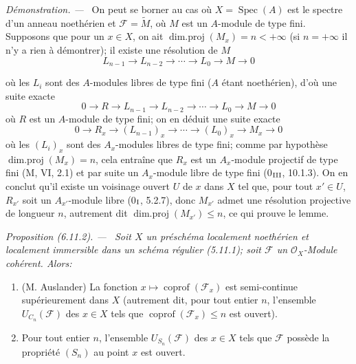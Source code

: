 \documentclass[10pt,oneside]{book}
\newcommand{\oldpage}[2][]{%
  \setcounter{footnote}{0}%
  \marginpar{\scriptsize\textbf{#1}~|~#2}\ignorespaces}
\newenvironment{proposition}[1][]{%
  \par\medskip\noindent\itshape Proposition (#1). ---\ }{\par}
\newenvironment{proof}{%
  \par\medskip\noindent\textit{Démonstration. ---\ }}{\par}
\begin{document}
\begin{proof}
On peut se borner au cas où $X=\operatorname{Spec}(A)$ est le spectre d'un
anneau noethérien et $\mathcal F=\widetilde M$, où $M$ est un $A$-module de
type fini. Supposons que pour un $x\in X$, on ait
$\operatorname{dim.proj}(M_x)=n<+\infty$ (si $n=+\infty$ il n'y a rien à
démontrer); il existe une résolution de $M$
\[
L_{n-1}\longrightarrow L_{n-2}\longrightarrow\cdots
\longrightarrow L_0\longrightarrow M\longrightarrow0
\]

\oldpage[IV-2]{159}

où les $L_i$ sont des $A$-modules libres de type fini ($A$ étant
noethérien), d'où une suite exacte
\[
0\longrightarrow R\longrightarrow L_{n-1}\longrightarrow L_{n-2}
\longrightarrow\cdots\longrightarrow L_0\longrightarrow M
\longrightarrow0
\]
où $R$ est un $A$-module de type fini; on en déduit une suite exacte
\[
0\longrightarrow R_x\longrightarrow(L_{n-1})_x\longrightarrow\cdots
\longrightarrow(L_0)_x\longrightarrow M_x\longrightarrow0
\]
où les $(L_i)_x$ sont des $A_x$-modules libres de type fini; comme par
hypothèse $\operatorname{dim.proj}(M_x)=n$, cela entraîne que $R_x$ est un
$A_x$-module projectif de type fini (M, VI, 2.1) et par suite un
$A_x$-module libre de type fini (0$_{\rm III}$, 10.1.3). On en conclut qu'il
existe un voisinage ouvert $U$ de $x$ dans $X$ tel que, pour tout
$x'\in U$, $R_{x'}$ soit un $A_{x'}$-module libre (0$_{\rm I}$, 5.2.7),
donc $M_{x'}$ admet une résolution projective de longueur $n$, autrement
dit $\operatorname{dim.proj}(M_{x'})\leq n$, ce qui prouve le lemme.
\end{proof}

\begin{proposition}[6.11.2]
\label{IV.2.s6.11.2-fr}
Soit $X$ un préschéma localement noethérien et localement immersible dans
un schéma régulier (5.11.1); soit $\mathcal F$ un $\mathcal O_X$-Module
cohérent. Alors:
\begin{enumerate}
\item[(i)] (M. Auslander) La fonction
$x\mapsto\operatorname{coprof}(\mathcal F_x)$ est semi-continue
supérieurement dans $X$ (autrement dit, pour tout entier $n$, l'ensemble
$U_{C_n}(\mathcal F)$ des $x\in X$ tels que
$\operatorname{coprof}(\mathcal F_x)\leq n$ est ouvert).
\item[(ii)] Pour tout entier $n$, l'ensemble $U_{S_n}(\mathcal F)$ des
$x\in X$ tels que $\mathcal F$ possède la propriété $(S_n)$ au point $x$
est ouvert.
\end{enumerate}
\end{proposition}
\end{document}
